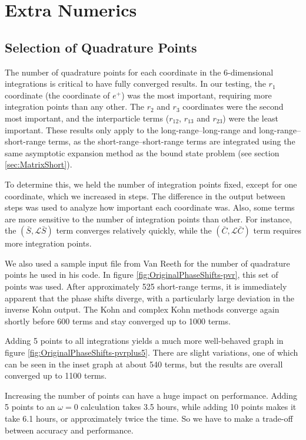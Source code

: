 \documentclass[Dissertation.tex]{subfiles}
\begin{document}
\chapter{Extra Numerics}
\label{chp:ExtraNumerics}

\section{Selection of Quadrature Points}
\label{sec:SelQuadPoints1}
The number of quadrature points for each coordinate in the 6-dimensional integrations is critical to have fully converged results. In our testing, the $r_1$ coordinate (the coordinate of $e^+$) was the most important, requiring more integration points than any other. The $r_2$ and $r_3$ coordinates were the second most important, and the interparticle terms ($r_{12}$, $r_{13}$ and $r_{23}$) were the least important. These results only apply to the long-range--long-range and long-range--short-range terms, as the short-range--short-range terms are integrated using the same asymptotic expansion method as the bound state problem (see section \ref{sec:MatrixShort}).

To determine this, we held the number of integration points fixed, except for one coordinate, which we increased in steps. The difference in the output between steps was used to analyze how important each coordinate was. Also, some terms are more sensitive to the number of integration points than other. For instance, the $(\bar{S},\mathcal{L} \bar{S})$ term converges relatively quickly, while the $(\bar{C},\mathcal{L} \bar{C})$ term requires more integration points.

We also used a sample input file from Van Reeth for the number of quadrature points he used in his code. In figure \ref{fig:OriginalPhaseShifts-pvr}, this set of points was used. After approximately 525 short-range terms, it is immediately apparent that the phase shifts diverge, with a particularly large deviation in the inverse Kohn output. The Kohn and complex Kohn methods converge again shortly before 600 terms and stay converged up to 1000 terms.

Adding 5 points to all integrations yields a much more well-behaved graph in figure \ref{fig:OriginalPhaseShifts-pvrplus5}. There are slight variations, one of which can be seen in the inset graph at about 540 terms, but the results are overall converged up to 1100 terms.

Increasing the number of points can have a huge impact on performance. Adding 5 points to an $\omega = 0$ calculation takes 3.5 hours, while adding 10 points makes it take 6.1 hours, or approximately twice the time. So we have to make a trade-off between accuracy and performance.
\end{document}
